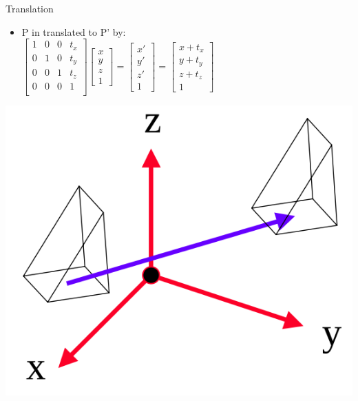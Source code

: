 \documentclass[xcolor=table]{beamer}
\begin{document}
\begin{frame}{Translation}

\begin{itemize}
\item P in translated to P' by: \\
\centering
$
\begin{bmatrix}
1 & 0 & 0 & t_x \\
0 & 1 & 0 & t_y \\
0 & 0 & 1 & t_z \\
0 & 0 & 0 & 1 \\
\end{bmatrix}
\begin{bmatrix}
x \\ y \\ z \\ 1
\end{bmatrix}
=
\begin{bmatrix}
x' \\ y' \\ z' \\ 1
\end{bmatrix}
=
\begin{bmatrix}
x+t_x \\ y+t_y \\ z+t_z \\ 1
\end{bmatrix}
$
\end{itemize}
\includegraphics[scale=0.20]{media/translation.png}

\end{frame}
\end{document}
